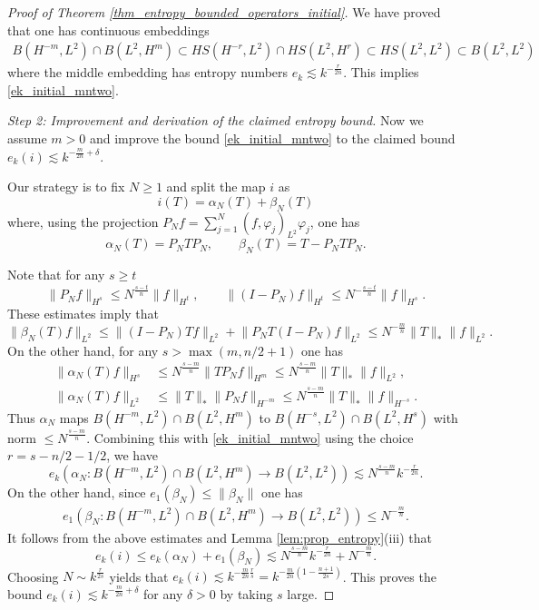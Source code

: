 \documentclass[12pt,twoside]{amsart}
\numberwithin{equation}{section}
\renewcommand{\leq}{\leqslant}
\renewcommand{\geq}{\geqslant}
\newcommand{\norm}[1]{\lVert #1 \rVert}         %
\begin{document}
\begin{proof}[Proof of Theorem \ref{thm_entropy_bounded_operators_initial}]
We have proved that one has continuous embeddings 
\begin{align}
\label{eq:z0}
B(H^{-m}, L^2) \cap B(L^2, H^m) \subset HS(H^{-r}, L^2) \cap HS(L^2, H^r) \subset HS(L^2, L^2) \subset B(L^2, L^2)
\end{align}
where the middle embedding has entropy numbers  $e_k \lesssim k^{-\frac{r}{2n}}$. This implies \eqref{ek_initial_mntwo}.

\emph{Step 2: Improvement and derivation of the claimed entropy bound.}
Now we assume $m > 0$ and improve the bound \eqref{ek_initial_mntwo} to the claimed bound $e_k(i) \lesssim k^{-\frac{m}{2n}+\delta}$. 
  
Our strategy is to fix $N \geq 1$ and split the map $i$ as 
\[
i(T) = \alpha_N(T) + \beta_N(T)
\]
where, using the projection $P_N f = \sum_{j=1}^N (f, \varphi_j)_{L^2} \varphi_j$, one has 
\[
\alpha_N(T) = P_N T P_N, \qquad \beta_N(T) = T - P_N T P_N.
\]
  
Note that for any $s \geq t$ 
\[
\norm{P_N f}_{H^s} \leq N^{\frac{s-t}{n}} \norm{f}_{H^t}, \qquad \norm{(I - P_N) f}_{H^t} \leq N^{-\frac{s-t}{n}} \norm{f}_{H^s}.
\]
These estimates imply that 
\[
\norm{\beta_N(T) f}_{L^2} \leq \norm{(I - P_N) T f}_{L^2} + \norm{P_N T(I - P_N) f}_{L^2} \leq N^{-\frac{m}{n}} \norm{T}_{*} \norm{f}_{L^2}.
\]
On the other hand, for any $s > \max(m, n/2+1)$ one has 
\begin{align*}
\norm{\alpha_N(T) f}_{H^s} &\leq N^{\frac{s-m}{n}} \norm{T P_N f}_{H^m} \leq N^{\frac{s-m}{n}} \norm{T}_* \norm{f}_{L^2}, \\
\norm{\alpha_N(T) f}_{L^2} &\leq \norm{T}_* \norm{P_N f}_{H^{-m}} \leq N^{\frac{s-m}{n}} \norm{T}_* \norm{f}_{H^{-s}}.
\end{align*}
Thus $\alpha_N$ maps $B(H^{-m}, L^2) \cap B(L^2, H^m)$ to $B(H^{-s},L^2) \cap B(L^2, H^s)$ with norm $\leq N^{\frac{s-m}{n}}$. Combining this with \eqref{ek_initial_mntwo} using the choice $r = s - n/2 - 1/2$, we have 
\[
e_k(\alpha_N: B(H^{-m}, L^2) \cap B(L^2, H^m) \to B(L^2, L^2)) \lesssim N^{\frac{s-m}{n}} k^{-\frac{r}{2n}}.
\]
On the other hand, since $e_1(\beta_N) \leq \norm{\beta_N}$ one has 
\begin{align*}
e_1(\beta_N: B(H^{-m}, L^2) \cap B(L^2, H^m) \to B(L^2, L^2)) \leq N^{-\frac{m}{n}}.
\end{align*}
It follows from the above estimates and Lemma \ref{lem:prop_entropy}(iii) that 
\[
e_k(i) \leq e_k(\alpha_N) + e_1(\beta_N) \lesssim N^{\frac{s-m}{n}} k^{-\frac{r}{2n}} + N^{-\frac{m}{n}}.
\]
Choosing $N \sim k^{\frac{r}{2s}}$ yields that $e_k(i) \lesssim k^{-\frac{m}{2n} \frac{r}{s}} = k^{-\frac{m}{2n} (1-\frac{n+1}{2s})}$. This proves the bound $e_k(i) \lesssim k^{-\frac{m}{2n}+\delta}$ for any $\delta > 0$ by taking $s$ large.
\end{proof}
\end{document}
